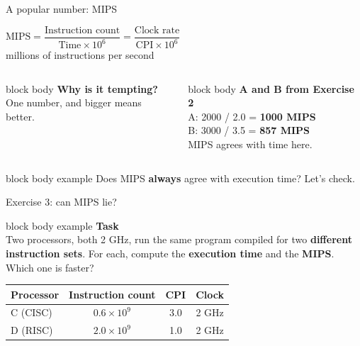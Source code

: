 \documentclass[aspectratio=169,10pt]{beamer}
\newcommand{\stepbox}[2]{%
  \begin{beamercolorbox}[rounded=true,sep=0.09cm,wd=\linewidth]{block body}
    \footnotesize\textbf{#1}\\ #2
  \end{beamercolorbox}\vspace{0.06cm}}
\newcommand{\taskhead}[2]{%
  \begin{beamercolorbox}[rounded=true,sep=0.12cm,wd=\linewidth]{block body example}
    \small\textbf{#1}\\[0.04cm]
    \footnotesize #2
  \end{beamercolorbox}\vspace{0.1cm}}
\newcommand{\keymsg}[1]{%
  \begin{beamercolorbox}[rounded=true,sep=0.1cm,wd=\textwidth]{block body example}
    \centering\footnotesize #1
  \end{beamercolorbox}}
\begin{document}
\begin{frame}{A popular number: MIPS}
  \begin{center}
    \Large
    $\text{MIPS} = \dfrac{\text{Instruction count}}{\text{Time} \times 10^6} = \dfrac{\text{Clock rate}}{\text{CPI} \times 10^6}$\\[0.2cm]
    \normalsize millions of instructions per second
  \end{center}
  \vspace{0.2cm}
  \begin{columns}[T,onlytextwidth]
      \stepbox{Why is it tempting?}{One number, and bigger means better.}
      \stepbox{A and B from Exercise 2}{A: 2000 / 2.0 = \textbf{1000 MIPS}\\ B: 3000 / 3.5 = \textbf{857 MIPS}\\
        MIPS agrees with time here.}
  \end{columns}
  \vfill
  \keymsg{Does MIPS \textbf{always} agree with execution time? Let's check.}
\end{frame}

\begin{frame}{Exercise 3: can MIPS lie?}
  \taskhead{Task}{Two processors, both 2 GHz, run the same program compiled for two
    \textbf{different instruction sets}. For each, compute the \textbf{execution time} and the \textbf{MIPS}.
    Which one is faster?}
  \vspace{0.3cm}
  \begin{center}
    \small
    \renewcommand{\arraystretch}{1.4}
    \begin{tabular}{lccc}
      \toprule
      Processor & Instruction count & CPI & Clock \\
      \midrule
      C (CISC) & $0.6 \times 10^9$ & 3.0 & 2 GHz \\
      D (RISC) & $2.0 \times 10^9$ & 1.0 & 2 GHz \\
      \bottomrule
    \end{tabular}
  \end{center}
\end{frame}
\end{document}

